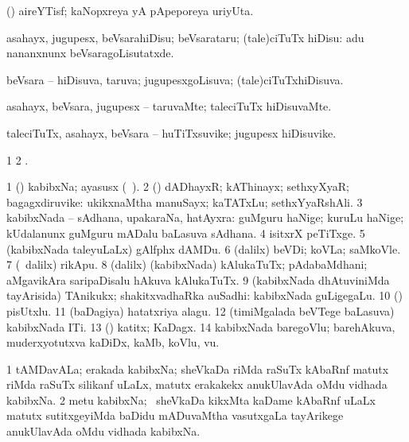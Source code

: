 \bentry
{}
\gl{\nA}
\bmng
(\veYshA) aireYTisf; kaNopxreya yA pApeporeya uriyUta. 
\emng
\eentry

\bentry
{}
\gl{\sakirx}
\bmng
asahayx, jugupesx, beVsarahiDisu; beVsarataru; (tale)ciTuTx hiDisu:  adu nananxnunx beVsaragoLisutatxde. 
\emng
\eentry

\bentry
{}
\gl{\gu}
\bmng
beVsara -- hiDisuva, taruva; jugupesxgoLisuva; (tale)ciTuTxhiDisuva. 
\emng
\eentry

\bentry
{}
\gl{\kirxvi}
\bmng
asahayx, beVsara, jugupesx -- taruvaMte; taleciTuTx hiDisuvaMte. 
\emng
\eentry

\bentry
{}
\gl{\nA}
\bmng
taleciTuTx, asahayx, beVsara -- huTiTxsuvike; jugupesx hiDisuvike. 
\emng
\eentry

\bentry
{}
\gl{\saMkiSx}
\bmng
\bnum
\num{1}  
\num{2} . 
\enum
\emng
\eentry

\bentry
{}
\gl{\nA}
\bmng
\bnum
\num{1} (\ravi) kabibxNa; ayasusx (\saMkeV\ ). 
\num{2} (\rUpa) dADhayxR; kAThinayx; sethxyXyaR; bagagxdiruvike:  ukikxnaMtha manuSayx; kaTATxLu; sethxYyaRshAli. 
\num{3} kabibxNada -- sAdhana, upakaraNa, hatAyxra:  guMguru haNige; kuruLu haNige; kUdalanunx guMguru mADalu baLasuva sAdhana. 
\num{4} isitxrX peTiTxge. 
\num{5} (kabibxNada taleyuLaLx) gAlfphx dAMDu. 
\num{6} (\bava dalilx) beVDi; koVLa; saMkoVle. 
\num{7} (\sA\ \bava dalilx) rikApu. 
\num{8} (\bava dalilx) (kabibxNada) kAlukaTuTx; pAdabaMdhani; aMgavikAra saripaDisalu hAkuva kAlukaTuTx. 
\num{9} (kabibxNada dhAtuviniMda tayArisida) TAnikukx; shakitxvadhaRka auSadhi:  kabibxNada guLigegaLu. 
\num{10} (\ashi) pisUtxlu. 
\num{11} (baDagiya) hatatxriya alagu. 
\num{12} (timiMgalada beVTege baLasuva) kabibxNada ITi. 
\num{13} (\pArxparx) katitx; KaDagx. 
\num{14} kabibxNada baregoVlu; barehAkuva, muderxyotutxva kaDiDx, kaMb, koVlu, \mo vu. 
\enum
\emng

\noindent 
\gl{\pagu}
\bmng
\bnum
\num{1}  tAMDavALa; erakada kabibxNa; sheVkaDa riMda raSuTx kAbaRnf matutx riMda raSuTx silikanf uLaLx, matutx erakakekx anukUlavAda oMdu vidhada kabibxNa. 
\num{2}  metu kabibxNa; \sA\ sheVkaDa kikxMta kaDame kAbaRnf uLaLx matutx sutitxgeyiMda baDidu mADuvaMtha vasutxgaLa tayArikege anukUlavAda oMdu vidhada kabibxNa. 
\enum
\emng

